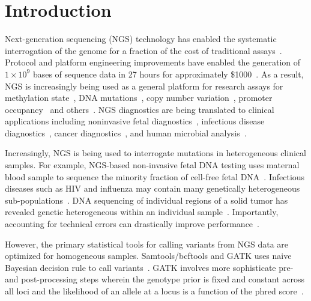 \documentclass{bioinfo}
\begin{document}
\section{Introduction}
\label{sec:intro}
Next-generation sequencing (NGS) technology has enabled the systematic interrogation of the genome for a fraction of the cost of traditional assays~\citep{Koboldt:2013kw}. Protocol and platform engineering improvements have enabled the generation of $1\times10^9$ bases of sequence data in 27 hours for approximately \$1000~\citep{Quail:2012hf}. As a result, NGS is increasingly being used as a general platform for research assays for methylation state~\citep{Laird:2010ab}, DNA mutations~\citep{Consortium:2013co}, copy number variation~\citep{Alkan:2009cr}, promoter occupancy~\citep{Ouyang:2009hc} and others~\citep{Rivera:2013ee}. NGS diagnostics are being translated to clinical applications including noninvasive fetal diagnostics~\citep{Kitzman:2012hea}, infectious disease diagnostics~\citep{Capobianchi:2012em}, cancer diagnostics~\citep{Navin:2010gu}, and human microbial analysis~\citep{Consortium:2013iz}.

Increasingly, NGS is being used to interrogate mutations in heterogeneous clinical samples. For example, NGS-based non-invasive fetal DNA testing uses maternal blood sample to sequence the minority fraction of cell-free fetal DNA~\citep{Fan:2008di}. Infectious diseases such as HIV and influenza may contain many genetically heterogeneous sub-populations~\citep{Flaherty:2011ja, Ghedin:2010ie}. DNA sequencing of individual regions of a solid tumor has revealed genetic heterogeneous within an individual sample~\citep{Navin:2010gu}. Importantly, accounting for technical errors can drastically improve performance~\citep{zagordi2010error}.

However, the primary statistical tools for calling variants from NGS data are optimized for homogeneous samples. Samtools/bcftools and GATK uses naive Bayesian decision rule to call variants~\citep{li2011statistical, depristo2011framework}. GATK involves more sophisticate pre- and post-processing steps wherein the genotype prior is fixed and constant across all loci and the likelihood of an allele at a locus is a function of the phred score~\citep{McKenna:2010bv}.
\end{document}
